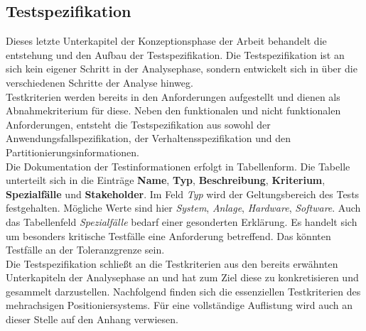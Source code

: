 \documentclass[../../../Bachelorarbeit.tex]{subfiles}
\begin{document}
\subsection{Testspezifikation}
Dieses letzte Unterkapitel der Konzeptionsphase der Arbeit behandelt die entstehung und den Aufbau der Testspezifikation. Die Testspezifikation ist an sich kein eigener Schritt in der Analysephase, sondern entwickelt sich in über die verschiedenen Schritte der Analyse hinweg.\\
Testkriterien werden bereits in den Anforderungen aufgestellt und dienen als Abnahmekriterium für diese. Neben den funktionalen und nicht funktionalen Anforderungen, entsteht die Testspezifikation aus sowohl der Anwendungsfallspezifikation, der Verhaltensspezifikation und den Partitionierungsinformationen.\\
Die Dokumentation der Testinformationen erfolgt in Tabellenform. Die Tabelle unterteilt sich in die Einträge \textbf{Name}, \textbf{Typ}, \textbf{Beschreibung}, \textbf{Kriterium}, \textbf{Spezialfälle} und \textbf{Stakeholder}. Im Feld \textit{Typ} wird der Geltungsbereich des Tests festgehalten. Mögliche Werte sind hier \textit{System}, \textit{Anlage}, \textit{Hardware}, \textit{Software}. Auch das Tabellenfeld \textit{Spezialfälle} bedarf einer gesonderten Erklärung. Es handelt sich um besonders kritische Testfälle eine Anforderung betreffend. Das könnten \zB Testfälle an der Toleranzgrenze sein.\\
Die Testspezifikation schließt an die Testkriterien aus den bereits erwähnten Unterkapiteln der Analysephase an und hat zum Ziel diese zu konkretisieren und gesammelt darzustellen. Nachfolgend finden sich die essenziellen Testkriterien des mehrachsigen Positioniersystems. Für eine vollständige Auflistung wird auch an dieser Stelle auf den Anhang verwiesen.
\end{document}
